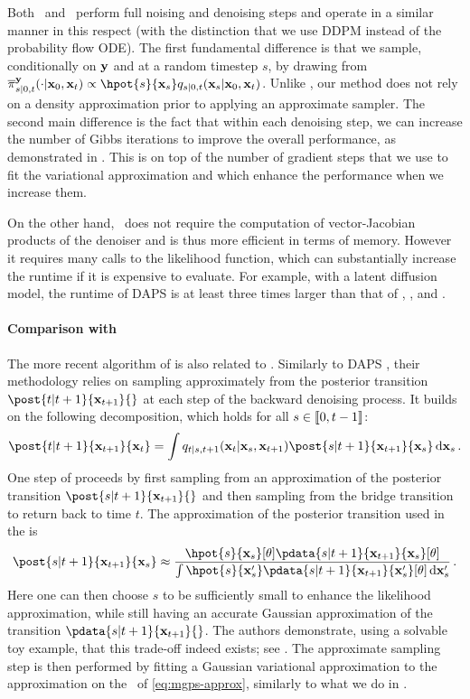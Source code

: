 Both \algo\ and \daps\ perform full noising and denoising steps and operate in a similar manner in this respect (with the distinction that we use DDPM instead of the probability flow ODE). The first fundamental difference is that we sample, conditionally on \({\mathbf{y}}\) and at a random timestep $s$, by drawing from \(\epost{s|0, t}{\bx_0, \bx_t}{} \propto \hpot{s}{\bx_s} \fw{s|0, t}{\bx_0, \bx_t}{\bx_s}\). Unlike \daps, our method does not rely on a density approximation prior to applying an approximate sampler. The second main difference is the fact that within each denoising step, we can increase the number of Gibbs iterations to improve the overall performance, as demonstrated in . This is on top of the number of gradient steps that we use to fit the variational approximation and which enhance the performance when we increase them.  

On the other hand, \daps\ does not require the computation of vector-Jacobian products of the denoiser and is thus more efficient in terms of memory. However it requires many calls to the likelihood function, which can substantially increase the runtime if it is expensive to evaluate. For example, with a latent diffusion model, the runtime of DAPS is at least three times larger than that of \algo, \resample, and \psld. 
\paragraph{Comparison with \citet{moufad2024variational}}
The more recent {} algorithm of \citet{moufad2024variational} is also related to \algo. Similarly to DAPS \cite{zhang2024daps}, their methodology relies on sampling approximately from the posterior transition $\post{t|t+1}{\bx_{t+1}}{}$ at each step of the backward denoising process. It builds on the following decomposition, which holds for all $s \in \llbracket 0, t-1 \rrbracket$:
$$ 
    \post{t|t+1}{\bx_{t+1}}{\bx_t} = \int \fw{t|s, t+1}{\bx_s, \bx_{t+1}}{\bx_t} \post{s|t+1}{\bx_{t+1}}{\bx_s} \, \rmd \bx_s \eqsp.
$$ 
One step of {} proceeds by first sampling from an approximation of the posterior transition $\post{s|t+1}{\bx_{t+1}}{}$ and then sampling from the bridge transition to return back to time $t$. The approximation of the posterior transition used in the {} is 
\begin{equation} 
    \label{eq:mgps-approx}
    \post{s|t+1}{\bx_{t+1}}{\bx_s} \approx \frac{\hpot{s}{\bx_s}[\param] \pdata{s|t+1}{\bx_{t+1}}{\bx_s}[\param]}{\int \hpot{s}{\bx^\prime _s} \pdata{s|t+1}{\bx_{t+1}}{\bx^\prime _s}[\param] \, \rmd \bx^\prime _s} \eqsp.
\end{equation}
Here one can then choose $s$ to be sufficiently small to enhance the likelihood approximation, while still having an accurate Gaussian approximation of the transition $\pdata{s|t+1}{\bx_{t+1}}{}$. The authors demonstrate, using a solvable toy example, that this trade-off indeed exists; see \citep[Example 3.2]{moufad2024variational}. The approximate sampling step is then performed by fitting a Gaussian variational approximation to the approximation on the \rhs\ of \eqref{eq:mgps-approx}, similarly to what we do in .  

